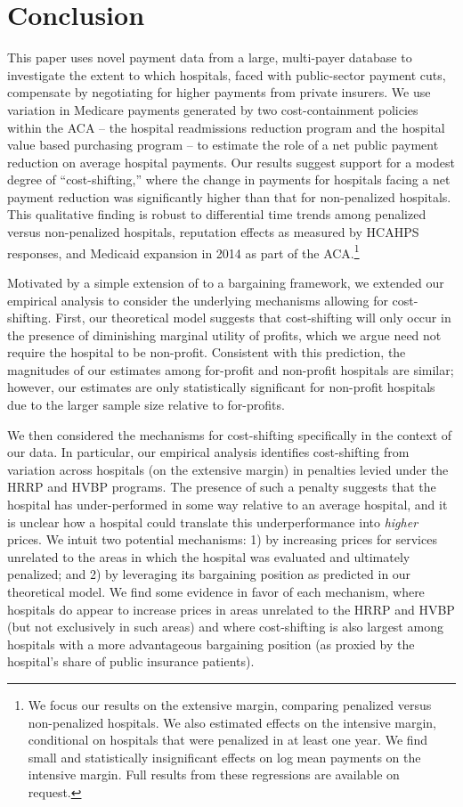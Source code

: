\documentclass[12pt]{article}
\begin{document}
\section{Conclusion}
\label{sec:Conclusion}
This paper uses novel payment data from a large, multi-payer database to investigate the extent to which hospitals, faced with public-sector payment cuts, compensate by negotiating for higher payments from private insurers.  We use variation in Medicare payments generated by two cost-containment policies within the ACA -- the hospital readmissions reduction program and the hospital value based purchasing program -- to estimate the role of a net public payment reduction on average hospital payments.  Our results suggest support for a modest degree of ``cost-shifting,''  where the change in payments for hospitals facing a net payment reduction was significantly higher than that for non-penalized hospitals. This qualitative finding is robust to differential time trends among penalized versus non-penalized hospitals, reputation effects as measured by HCAHPS responses, and Medicaid expansion in 2014 as part of the ACA.\footnote{We focus our results on the extensive margin, comparing penalized versus non-penalized hospitals. We also estimated effects on the intensive margin, conditional on hospitals that were penalized in at least one year. We find small and statistically insignificant effects on log mean payments on the intensive margin. Full results from these regressions are available on request.}

Motivated by a simple extension of \cite{dranove1988} to a bargaining framework, we extended our empirical analysis to consider the underlying mechanisms allowing for cost-shifting. First, our theoretical model suggests that cost-shifting will only occur in the presence of diminishing marginal utility of profits, which we argue need not require the hospital to be non-profit. Consistent with this prediction, the magnitudes of our estimates among for-profit and non-profit hospitals are similar; however, our estimates are only statistically significant for non-profit hospitals due to the larger sample size relative to for-profits.

We then considered the mechanisms for cost-shifting specifically in the context of our data. In particular, our empirical analysis identifies cost-shifting from variation across hospitals (on the extensive margin) in penalties levied under the HRRP and HVBP programs. The presence of such a penalty suggests that the hospital has under-performed in some way relative to an average hospital, and it is unclear how a hospital could translate this underperformance into \textit{higher} prices. We intuit two potential mechanisms: 1) by increasing prices for services unrelated to the areas in which the hospital was evaluated and ultimately penalized; and 2) by leveraging its bargaining position as predicted in our theoretical model. We find some evidence in favor of each mechanism, where hospitals do appear to increase prices in areas unrelated to the HRRP and HVBP (but not exclusively in such areas) and where cost-shifting is also largest among hospitals with a more advantageous bargaining position (as proxied by the hospital's share of public insurance patients).
\end{document}
